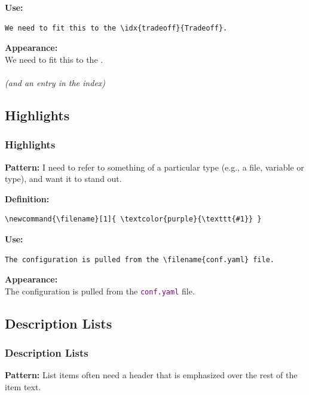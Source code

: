 {\begin{frame}[fragile]
  \vspace{5mm}
  \textbf{Use:}
  \begin{verbatim}
We need to fit this to the \idx{tradeoff}{Tradeoff}.
  \end{verbatim}
  
  \pause
  \vspace{5mm}
  \textbf{Appearance:} \\
  We need to fit this to the .
  \\\\
  \textsl{(and an entry in the index)}
\end{frame}

\subsection{Highlights}
\begin{frame}[fragile]
  \frametitle{Highlights}
  \vspace{3mm}
  \textbf{Pattern:} I need to refer to something of a particular type (e.g., a file, variable or type), and want it to stand out.
  
  \pause
  \vspace{5mm}
  \textbf{Definition:}
  \begin{verbatim}
\newcommand{\filename}[1]{ \textcolor{purple}{\texttt{#1}} }
  \end{verbatim}
  
  \vspace{5mm}
  \textbf{Use:}
  \begin{verbatim}
The configuration is pulled from the \filename{conf.yaml} file.
  \end{verbatim}
  
  \pause
  \vspace{5mm}
  \textbf{Appearance:}
  \\
  The configuration is pulled from the \textcolor{purple}{\texttt{conf.yaml}} file.
\end{frame}

\subsection{Description Lists}
\begin{frame}[fragile]
  \frametitle{Description Lists}
  \vspace{0mm}
  \textbf{Pattern:} List items often need a header that is emphasized over the rest of the item text.
  

\end{frame}}
